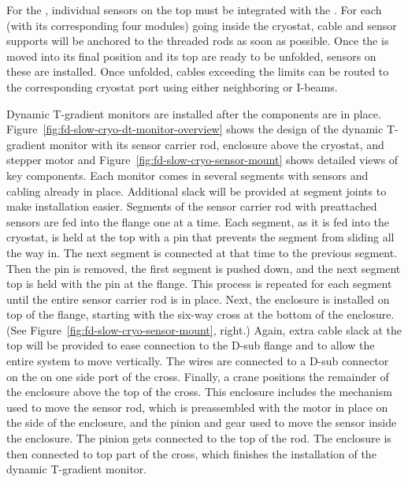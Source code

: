 For the , individual sensors on the top  must be integrated with the . For each  (with its corresponding four   modules)
going inside the cryostat, cable and sensor supports will be anchored to the   threaded rods as soon as possible.
Once the  is moved into its final position and its top  are ready to be unfolded, sensors on these  %
are installed. Once unfolded, cables 
exceeding the  limits can be routed to the corresponding cryostat port using either neighboring  or  I-beams. 



Dynamic T-gradient monitors %
are installed
after the  components are in place.
Figure~\ref{fig:fd-slow-cryo-dt-monitor-overview} shows the
design of the dynamic T-gradient monitor with its sensor carrier rod,
enclosure above the cryostat, and stepper motor and 
 Figure~\ref{fig:fd-slow-cryo-sensor-mount} shows detailed views of key
components.  Each monitor %
comes in several segments with sensors
and cabling already in place. Additional slack will be provided at
segment joints to make installation easier. Segments of the sensor
carrier rod with preattached sensors %
are fed into the flange one
at a time. Each segment, as it is fed into the %
cryostat, is %
held at the top with a pin that prevents the segment from sliding all
the way in. %
The next segment %
is connected at that
time to the previous segment. Then the pin %
is removed, the first
segment %
is pushed down, and the next segment top %
is held
with the pin at the flange. This process %
is repeated for each
segment %
until the entire sensor carrier rod is in
place.  Next, the enclosure %
is installed on top of the flange,
starting with the six-way cross at the bottom of the enclosure.  (See
 Figure~\ref{fig:fd-slow-cryo-sensor-mount}, right.)  Again, extra cable
slack at the top will be provided to ease connection to the D-sub
flange and to allow the entire system to move vertically.  The wires
are connected to a D-sub connector on the \fdth on one side port
of the cross. Finally, a crane %
positions the remainder
of the enclosure above the top of the cross.  This enclosure includes
the mechanism used to move the sensor rod, which %
is preassembled
with the motor in place on the side of the enclosure, and the pinion
and gear used to move the sensor inside the enclosure.  The pinion
gets connected to the top of the rod. The enclosure is then %
connected to top part of the cross, which finishes the installation of
the dynamic T-gradient monitor.

